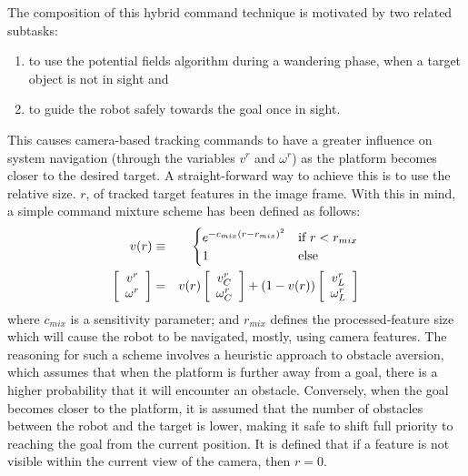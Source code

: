			The composition of this hybrid command technique is motivated by two related subtasks: 
				\begin{enumerate}
				\item to use the potential fields algorithm during a wandering phase, when a target object is not in sight and
				\item to guide the robot safely towards the goal once in sight.
				\end{enumerate}
			This causes camera-based tracking commands to have a greater influence on system navigation (through the variables $v^{r}$ and $\omega^{r}$) as the platform becomes closer to the desired target. A straight-forward way to achieve this is to use the relative size. $r$, of tracked target features in the image frame. With this in mind, a simple command mixture scheme has been defined as follows:
			\begin{eqnarray}
				v(r) &\equiv&
				\begin{cases}
				e^{ -c_{mix} \left( r - r_{mix}\right)^{2} } 	& \text{if } r < r_{mix}	\\
				1											& \text{else}
				\end{cases}
								\nonumber \\
						\left[\begin{array}{c} v^{r} 	\\ \omega^{r} 		\end{array} \right] &=& 	
				v(r)	\left[\begin{array}{c} v^{r}_{C}\\ \omega^{r}_{C} 	\end{array} \right] + 
				(1-v(r))\left[\begin{array}{c} v^{r}_{L}\\ \omega^{r}_{L} 	\end{array} \right] 
			\end{eqnarray}
			where $c_{mix}$ is a sensitivity parameter; and $r_{mix}$ defines the processed-feature size which will cause the robot to be navigated, mostly, using camera features. The reasoning for such a scheme involves a heuristic approach to obstacle aversion, which assumes that when the platform is further away from a goal, there is a higher probability that it will encounter an obstacle. Conversely, when the goal becomes closer to the platform, it is assumed that the number of obstacles between the robot and the target is lower, making it safe to shift full priority to reaching the goal from the current position. It is defined that if a feature is not visible within the current view of the camera, then $r=0$.

